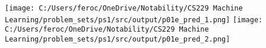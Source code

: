 \begin{answer}
\newline
  \texttt{[image: C:/Users/feroc/OneDrive/Notability/CS229 Machine Learning/problem\_sets/ps1/src/output/p01e\_pred\_1.png]}
  \texttt{[image: C:/Users/feroc/OneDrive/Notability/CS229 Machine Learning/problem\_sets/ps1/src/output/p01e\_pred\_2.png]}
\end{answer}
